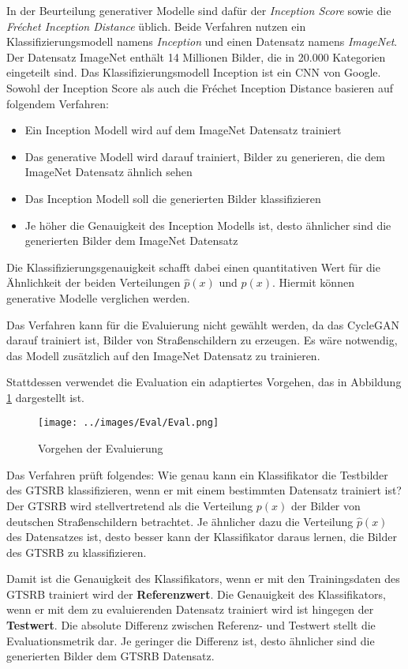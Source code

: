 In der Beurteilung generativer Modelle sind dafür der \emph{Inception Score} sowie die \emph{Fréchet Inception Distance} üblich. Beide Verfahren nutzen ein Klassifizierungsmodell namens \emph{Inception} und einen Datensatz namens \emph{ImageNet}. Der Datensatz ImageNet enthält 14 Millionen Bilder, die in 20.000 Kategorien eingeteilt sind. Das Klassifizierungsmodell Inception ist ein \ac{CNN} von Google. Sowohl der Inception Score als auch die Fréchet Inception Distance basieren auf folgendem Verfahren:
\begin{itemize}
	\item Ein Inception Modell wird auf dem ImageNet Datensatz trainiert
	\item Das generative Modell wird darauf trainiert, Bilder zu generieren, die dem ImageNet Datensatz ähnlich sehen
	\item Das Inception Modell soll die generierten Bilder klassifizieren
	\item Je höher die Genauigkeit des Inception Modells ist, desto ähnlicher sind die generierten Bilder dem ImageNet Datensatz
\end{itemize}
Die Klassifizierungsgenauigkeit schafft dabei einen quantitativen Wert für die Ähnlichkeit der beiden Verteilungen $\hat{p}(x)$ und $p(x)$. Hiermit können generative Modelle verglichen werden.

Das Verfahren kann für die Evaluierung nicht gewählt werden, da das \ac{CycleGAN} darauf trainiert ist, Bilder von Straßenschildern zu erzeugen. Es wäre notwendig, das Modell zusätzlich auf den ImageNet Datensatz zu trainieren.

Stattdessen verwendet die Evaluation ein adaptiertes Vorgehen, das in Abbildung \ref{fig:eval} dargestellt ist.

\begin{figure}[h]
	\centering
	\texttt{[image: ../images/Eval/Eval.png]}
	\caption{Vorgehen der Evaluierung}
	\label{fig:eval}
\end{figure}

Das Verfahren prüft folgendes: Wie genau kann ein Klassifikator die Testbilder des \ac{GTSRB} klassifizieren, wenn er mit einem bestimmten Datensatz trainiert ist? Der \ac{GTSRB} wird stellvertretend als die Verteilung $p(x)$ der Bilder von deutschen Straßenschildern betrachtet. Je ähnlicher dazu die Verteilung $\hat{p}(x)$ des Datensatzes ist, desto besser kann der Klassifikator daraus lernen, die Bilder des \ac{GTSRB} zu klassifizieren.

Damit ist die Genauigkeit des Klassifikators, wenn er mit den Trainingsdaten des \ac{GTSRB} trainiert wird der \textbf{Referenzwert}. Die Genauigkeit des Klassifikators, wenn er mit dem zu evaluierenden Datensatz trainiert wird ist hingegen der \textbf{Testwert}. Die absolute Differenz zwischen Referenz- und Testwert stellt die Evaluationsmetrik dar. Je geringer die Differenz ist, desto ähnlicher sind die generierten Bilder dem \ac{GTSRB} Datensatz.

